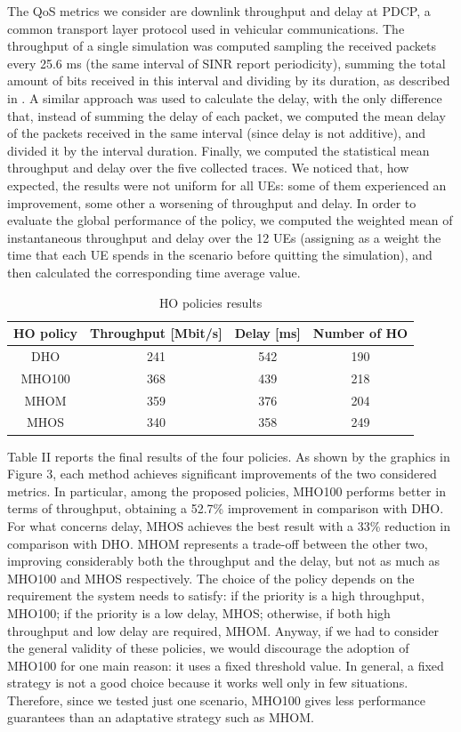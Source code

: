\documentclass[conference,10pt]{IEEEtran}
\begin{document}
The QoS metrics we consider are downlink throughput and delay at PDCP, a common transport layer protocol used in vehicular communications. The throughput of a single simulation was computed sampling the received packets every 25.6 ms (the same interval of SINR report periodicity), summing the total amount of bits received in this interval and dividing by its duration, as described in \cite{imphand}. A similar approach was used to calculate the delay, with the only difference that, instead of summing the delay of each packet, we computed the mean delay of the packets received in the same interval (since delay is not additive), and divided it by the interval duration. Finally, we computed the statistical mean throughput and delay over the five collected traces. We noticed that, how expected, the results were not uniform for all UEs: some of them experienced an improvement, some other a worsening of throughput and delay. In order to evaluate the global performance of the policy, we computed the weighted mean of instantaneous throughput and delay over the 12 UEs (assigning as a weight the time that each UE spends in the scenario before quitting the simulation), and then calculated the corresponding time average value.
\begin{table}[t]
	\begin{center}
		\begin{tabular}{cccc}
			\toprule
			HO policy & Throughput [Mbit/s] & Delay [ms] & Number of HO \\
			\midrule
			DHO & 241 & 542 & 190 \\
			MHO100 & 368 & 439 & 218 \\
			MHOM & 359 & 376 & 204 \\
			MHOS & 340 & 358 & 249 \\			
			
			\bottomrule
		\end{tabular}
		\caption{HO policies results}
	\end{center}
	\label{tab:bay3}
\end{table}
Table II reports the final results of the four policies. As shown by the graphics in Figure 3, each method achieves significant improvements of the two considered metrics. In particular, among the proposed policies, MHO100 performs better in terms of throughput, obtaining a 52.7\% improvement in comparison with DHO. For what concerns delay, MHOS achieves the best result with a 33\% reduction in comparison with DHO. MHOM represents a trade-off between the other two, improving considerably both the throughput and the delay, but not as much as MHO100 and MHOS respectively. The choice of the policy depends on the requirement the system needs to satisfy: if the priority is a high throughput, MHO100; if the priority is a low delay, MHOS; otherwise, if both high throughput and low delay are required, MHOM. Anyway, if we had to consider the general validity of these policies, we would discourage the adoption of MHO100 for one main reason: it uses a fixed threshold value. In general, a fixed strategy is not a good choice because it works well only in few situations. Therefore, since we tested just one scenario, MHO100 gives less performance guarantees than an adaptative strategy such as MHOM.
\end{document}
